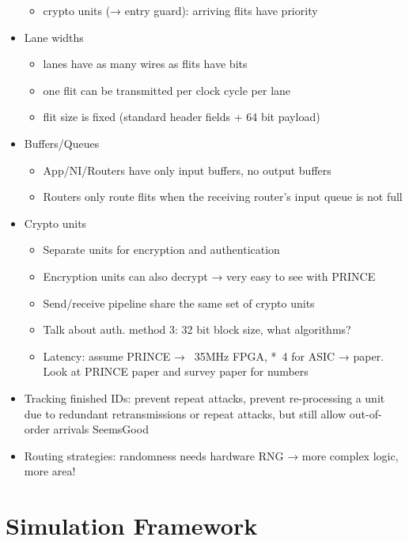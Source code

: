 \begin{itemize}
\begin{itemize}
            \item crypto units (→ entry guard): arriving flits have priority
        \end{itemize}
    \item Lane widths
        \begin{itemize}
            \item lanes have as many wires as flits have bits
            \item one flit can be transmitted per clock cycle per lane
            \item flit size is fixed (standard header fields + 64 bit payload)
        \end{itemize}
    \item Buffers/Queues
        \begin{itemize}
            \item App/NI/Routers have only input buffers, no output buffers
            \item Routers only route flits when the receiving router's input queue is not full
        \end{itemize}
    \item Crypto units
        \begin{itemize}
            \item Separate units for encryption and authentication
            \item Encryption units can also decrypt → very easy to see with PRINCE
            \item Send/receive pipeline share the same set of crypto units
            \item Talk about auth. method 3: 32 bit block size, what algorithms?
            \item Latency: assume PRINCE → ~35MHz FPGA, *~4 for ASIC → paper. Look at PRINCE paper and survey paper for numbers
        \end{itemize}
    \item Tracking finished IDs: prevent repeat attacks, prevent re-processing a unit due to redundant retransmissions or repeat attacks, but still
        allow out-of-order arrivals SeemsGood
    \item Routing strategies: randomness needs hardware RNG → more complex logic, more area!
\end{itemize}

\section{Simulation Framework}

